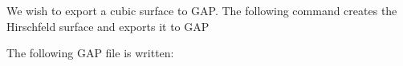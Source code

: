 We wish to export a cubic surface to GAP. 
The following command 
creates the Hirschfeld surface and exports it to GAP


The following GAP file is written:
